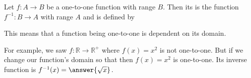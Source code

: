 \documentclass{ximera}
\begin{document}
\begin{definition}\label{definition:1-14}
Let $f: A \rightarrow B$ be a one-to-one function with range $B$. Then its  is the function $f^{-1}: B \rightarrow A$ with range $A$ and is defined by
\end{definition}

This means that a function being one-to-one is dependent on its domain.

\begin{example}\label{example:1-15}
For example, we saw $f: \mathbb{R} \rightarrow \mathbb{R}^{+}$ where $f(x)=x^{2}$ is not one-to-one.
But if we change our function's domain so that  then $f(x)=x^{2}$ is one-to-one. Its inverse function is $f^{-1}(x)=\answer{\sqrt{x}}$.
\end{example}
\end{document}
